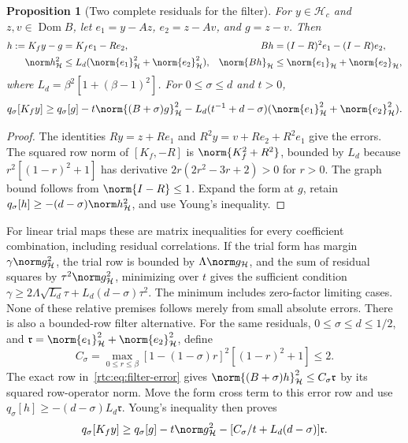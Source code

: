 \documentclass[11pt,a4paper]{article}
\numberwithin{equation}{section}
\newtheorem{proposition}[theorem]{Proposition}
\theoremstyle{definition}\newtheorem{definition}[theorem]{Definition}
\theoremstyle{remark}\newtheorem{remark}[theorem]{Remark}
\newcommand{\Hh}{\mathcal H}\newcommand{\Hw}{\mathcal H}
\begin{document}
\begin{proposition}[Two complete residuals for the filter]\label{rtc:prop:filter-error}
For $y\in\Hh_c$ and $z,v\in\operatorname{Dom}B$, let
$e_1=y-Az$, $e_2=z-Av$, and $g=z-v$. Then
\begin{align}\label{rtc:eq:filter-error}
 h:=K_fy-g&=K_fe_1-Re_2,&
 Bh&=(I-R)^2e_1-(I-R)e_2,\\
 \norm h_{\Hh}^2&\le L_d(\norm{e_1}_{\Hh}^2+\norm{e_2}_{\Hh}^2),&
 \norm{Bh}_{\Hh}&\le\norm{e_1}_{\Hh}+\norm{e_2}_{\Hh},\notag
\end{align}
where $L_d=\beta^2[1+(\beta-1)^2]$.
For $0\le\sigma\le d$ and $t>0$,
\begin{equation}\label{rtc:eq:filter-gate}
 q_\sigma[K_fy]\ge q_\sigma[g]-t\norm{(B+\sigma)g}_{\Hh}^2
 -L_d(t^{-1}+d-\sigma)(\norm{e_1}_{\Hh}^2+\norm{e_2}_{\Hh}^2).
\end{equation}
\end{proposition}
\begin{proof}
The identities $Ry=z+Re_1$ and $R^2y=v+Re_2+R^2e_1$ give the errors.
The squared row norm of $[K_f,-R]$ is $\norm{K_f^2+R^2}$, bounded by
$L_d$ because $r^2[(1-r)^2+1]$ has derivative
$2r(2r^2-3r+2)>0$ for $r>0$. The graph bound follows from
$\norm{I-R}\le1$. Expand the form at $g$, retain
$q_\sigma[h]\ge-(d-\sigma)\norm h_{\Hh}^2$, and use Young's inequality.
\end{proof}
For linear trial maps these are matrix inequalities for every coefficient
combination, including residual correlations. If the trial form has margin
$\gamma\norm g_{\Hh}^2$, the trial row is bounded by
$\Lambda\norm g_{\Hh}$, and the sum of residual squares by
$\tau^2\norm g_{\Hh}^2$, minimizing over $t$ gives the sufficient condition
$\gamma\ge2\Lambda\sqrt{L_d}\tau+L_d(d-\sigma)\tau^2$.
The minimum includes zero-factor limiting cases. None of these relative
premises follows merely from small absolute errors.
There is also a bounded-row filter alternative. For the same residuals,
$0\le\sigma\le d\le1/2$, and $\mathfrak r=\norm{e_1}_{\Hh}^2+
\norm{e_2}_{\Hh}^2$, define
\[
 C_\sigma=\max_{0\le r\le\beta}
 [1-(1-\sigma)r]^2[(1-r)^2+1]\le2.
\]
The exact row in~\eqref{rtc:eq:filter-error} gives
$\norm{(B+\sigma)h}_{\Hh}^2\le C_\sigma\mathfrak r$ by its squared
row-operator norm. Move the form cross term to this error row and use
$q_\sigma[h]\ge-(d-\sigma)L_d\mathfrak r$. Young's inequality then proves
\begin{equation}\label{rtc:eq:row-free-filter}
 q_\sigma[K_fy]\ge q_\sigma[g]-t\norm g_{\Hh}^2
       -[C_\sigma/t+L_d(d-\sigma)]\mathfrak r.
\end{equation}
\end{document}
